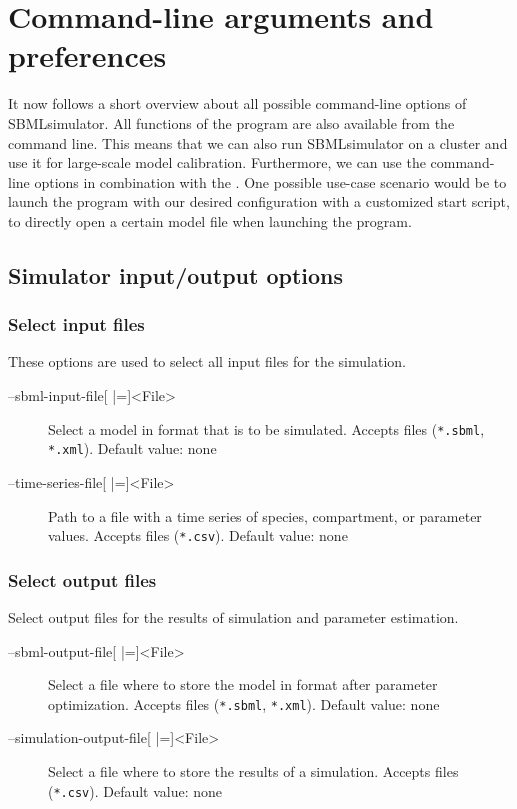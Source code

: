 \chapter{Command-line arguments and preferences}
\label{chap:CMD}

It now follows a short overview about all possible command-line options of SBMLsimulator.
All functions of the program are also available from the command line.
This means that we can also run SBMLsimulator on a cluster and use it for large-scale model calibration.
Furthermore, we can use the command-line options in combination with the \GUI.
One possible use-case scenario would be to launch the program with our desired configuration with a customized start script, \eg to directly open a certain model file when launching the program.


\renewcommand{\descriptionlabel}[1]{\textcolor{blue}{\texttt{#1}}}

\section{Simulator input/output options}
\subsection{Select input files}
These options are used to select all input files for the simulation.
\begin{description}
\item[--sbml-input-file{[} |={]}<File>]
          Select a model in \SBML format that is to be simulated. Accepts
          \SBML files (\texttt{*.sbml}, \texttt{*.xml}).
          Default value: none
\item[--time-series-file{[} |={]}<File>] Path to a file with a time series of
          species, compartment, or parameter
          values. Accepts \CSV files (\texttt{*.csv}).
          Default value: none
\end{description}

\subsection{Select output files}
Select output files for the results of simulation and parameter estimation.
\begin{description}
\item[--sbml-output-file{[} |={]}<File>]
          Select a file where to store the model in \SBML format after parameter
          optimization. Accepts \SBML files (\texttt{*.sbml}, \texttt{*.xml}).
          Default value: none

\item[--simulation-output-file{[} |={]}<File>]
          Select a file where to store the results of a simulation. Accepts
          \CSV files (\texttt{*.csv}).
          Default value: none
\end{description}

